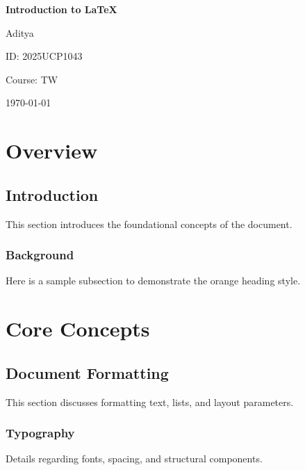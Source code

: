\documentclass[12pt, a4paper]{report}
\begin{document}
\begin{titlepage}
    \centering
    \vspace*{2cm}
    {\Huge\bfseries Introduction to \LaTeX\par}
    \vspace{2.5cm}
    {\Large Aditya\par}
    \vspace{0.5cm}
    {ID: 2025UCP1043\par}
    \vspace{2cm}
    {Course: TW\par}
    \vspace{0.3cm}
    \vfill
    {\today\par}
\end{titlepage}

\begin{abstract}
This document provides an introduction to \LaTeX{} typesetting, covering the configuration of the report document class, custom title page creation, header customization, and styling of section headings with packages like \texttt{sectsty}.
\end{abstract}

\chapter{Overview}
\section{Introduction}
This section introduces the foundational concepts of the document.

\subsection{Background}
Here is a sample subsection to demonstrate the orange heading style.

\chapter{Core Concepts}
\section{Document Formatting}
This section discusses formatting text, lists, and layout parameters.

\subsection{Typography}
Details regarding fonts, spacing, and structural components.
\end{document}
